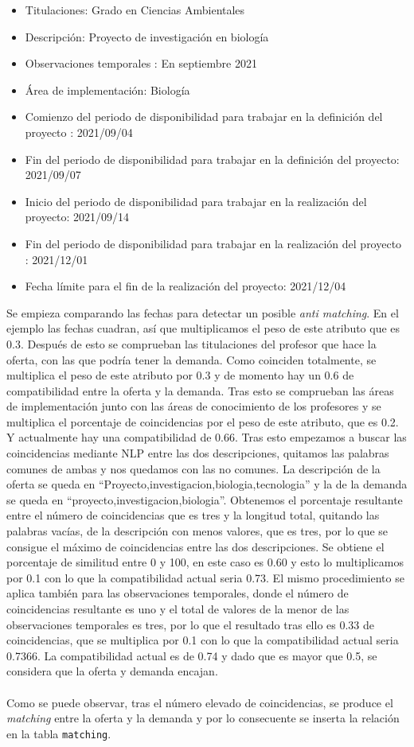 \documentclass[11pt]{book}
\begin{document}
	\begin{itemize} 
		\item Titulaciones: Grado en Ciencias Ambientales
		\item Descripción: Proyecto de investigación en biología
		\item Observaciones temporales : En septiembre 2021
		\item Área de implementación: Biología
		\item Comienzo del periodo de disponibilidad para trabajar en la definición del
		proyecto : 2021/09/04
		\item Fin del periodo de disponibilidad para trabajar en la definición del
		proyecto: 2021/09/07
		\item Inicio del periodo de disponibilidad para trabajar en la realización del
		proyecto: 2021/09/14
		\item Fin del periodo de disponibilidad para trabajar en la realización del
		proyecto : 2021/12/01
		\item Fecha límite para el fin de la realización del proyecto: 2021/12/04
	\end{itemize}
	Se empieza comparando las fechas para detectar un posible \emph{anti matching}. En el ejemplo las fechas cuadran, así que multiplicamos el peso de este atributo que es 0.3. Después de esto se comprueban las titulaciones del profesor que hace la oferta, con las que podría tener la demanda. Como coinciden totalmente, se multiplica el peso de este atributo por 0.3 y de momento hay un 0.6 de compatibilidad entre la oferta y la demanda. Tras esto se comprueban las áreas de implementación junto con las áreas de conocimiento de los profesores y se multiplica el porcentaje de coincidencias por el peso de este atributo, que es 0.2. Y actualmente hay una compatibilidad de 0.66. Tras esto empezamos a buscar las coincidencias mediante NLP entre las dos descripciones, quitamos las palabras comunes de ambas y nos quedamos con las no comunes. La descripción de la oferta se queda en “Proyecto,investigacion,biologia,tecnologia” y la de la demanda se queda en “proyecto,investigacion,biologia”. Obtenemos el porcentaje resultante entre el número de coincidencias que es tres y la longitud total, quitando las palabras vacías, de la descripción con menos valores, que es tres, por lo que se consigue el máximo de coincidencias entre las dos descripciones. Se obtiene el porcentaje de similitud entre 0 y 100,  en este caso es 0.60 y esto lo multiplicamos por 0.1 con lo que la compatibilidad actual seria 0.73. El mismo procedimiento se aplica también para las observaciones temporales, donde el número de coincidencias resultante es uno y el total de valores de la menor de las observaciones temporales es tres, por lo que el resultado tras ello es 0.33 de coincidencias, que se multiplica por 0.1 con lo que la compatibilidad actual seria 0.7366. La compatibilidad actual es de 0.74 y dado que es mayor que 0.5, se considera que la oferta y demanda encajan.\\\\
	Como se puede observar, tras el número elevado de coincidencias, se produce el \emph{matching} entre la oferta y la demanda y por lo consecuente se inserta la relación en la tabla \texttt{matching}.\\\\
\end{document}
